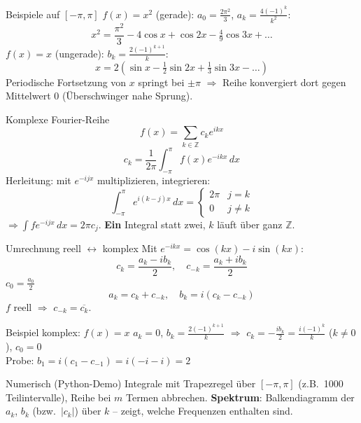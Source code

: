 \documentclass[a4paper, fontsize=7pt]{scrartcl}
\def\Z{\mathbb{Z}}  %
\def\dx{\,dx}
\begin{document}
\begin{subbox}{Beispiele auf $[-\pi, \pi]$}
\textbf{$f(x) = x^2$} (gerade): $a_0 = \frac{2\pi^2}{3}$,
$a_k = \frac{4(-1)^k}{k^2}$:
$$x^2 = \frac{\pi^2}{3} - 4\cos x + \cos 2x - \tfrac{4}{9}\cos 3x
+ \ldots$$
\textbf{$f(x) = x$} (ungerade): $b_k = \frac{2(-1)^{k+1}}{k}$:
$$x = 2\left(\sin x - \tfrac{1}{2}\sin 2x + \tfrac{1}{3}\sin 3x
- \ldots\right)$$
Periodische Fortsetzung von $x$ springt bei $\pm\pi$ $\Rightarrow$
Reihe konvergiert dort gegen Mittelwert $0$ (Überschwinger nahe
Sprung).
\end{subbox}

\begin{mainbox}{Komplexe Fourier-Reihe}
$$\boxed{f(x) = \sum_{k \in \Z} c_k e^{ikx}}$$
$$\boxed{c_k = \frac{1}{2\pi}\int_{-\pi}^{\pi} f(x)e^{-ikx}\dx}$$
Herleitung: mit $e^{-ijx}$ multiplizieren, integrieren:
$$\int_{-\pi}^{\pi} e^{i(k-j)x}\dx =
\begin{cases} 2\pi & j = k\\ 0 & j \ne k \end{cases}$$
$\Rightarrow \int f e^{-ijx}\dx = 2\pi c_j$.
\textbf{Ein} Integral statt zwei, $k$ läuft über ganz $\Z$.
\end{mainbox}

\begin{mainbox}{Umrechnung reell $\leftrightarrow$ komplex}
Mit $e^{-ikx} = \cos(kx) - i\sin(kx)$:
$$c_k = \frac{a_k - ib_k}{2}, \quad c_{-k} = \frac{a_k + ib_k}{2}$$
$c_0 = \frac{a_0}{2}$
$$\boxed{a_k = c_k + c_{-k}, \quad b_k = i(c_k - c_{-k})}$$
$f$ reell $\Rightarrow$ $c_{-k} = \overline{c_k}$.
\end{mainbox}

\begin{subbox}{Beispiel komplex: $f(x) = x$}
$a_k = 0$, $b_k = \frac{2(-1)^{k+1}}{k}$ $\Rightarrow$
$c_k = -\frac{i b_k}{2} = \frac{i(-1)^k}{k}$ ($k \ne 0$), $c_0 = 0$\\
Probe: $b_1 = i(c_1 - c_{-1}) = i(-i - i) = 2$ \checkmark
\end{subbox}

\begin{subbox}{Numerisch (Python-Demo)}
Integrale mit Trapezregel über $[-\pi, \pi]$ (z.B.\ 1000 Teilintervalle),
Reihe bei $m$ Termen abbrechen. \textbf{Spektrum}: Balkendiagramm der
$a_k$, $b_k$ (bzw.\ $|c_k|$) über $k$ -- zeigt, welche Frequenzen
enthalten sind.
\end{subbox}
\end{document}
